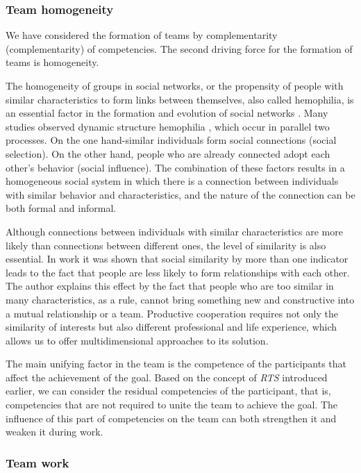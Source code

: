 \documentclass[12pt]{report}
\theoremstyle{definition}
\begin{document}
\subsubsection{Team homogeneity}

We have considered the formation of teams by complementarity (complementarity) of competencies. 
The second driving force for the formation of teams is homogeneity.

The homogeneity of groups in social networks, or the propensity of people with similar characteristics to form links between themselves, also called hemophilia, is an essential factor in the formation and evolution of social networks \cite{mcpherson2001birds}. 
Many studies observed dynamic structure hemophilia \cite{snijders2010introduction,steglich20108}, which occur in parallel two processes.
On the one hand-similar individuals form social connections (social selection). 
On the other hand, people who are already connected adopt each other's behavior (social influence).
The combination of these factors results in a homogeneous social system in which there is a connection between individuals with similar behavior and characteristics, and the nature of the connection can be both formal and informal.

Although connections between individuals with similar characteristics are more likely than connections between different ones, the level of similarity is also essential.
In work \cite{block2014multidimensional} it was shown that social similarity by more than one indicator leads to the fact that people are less likely to form relationships with each other. 
The author explains this effect by the fact that people who are too similar in many characteristics, as a rule, cannot bring something new and constructive into a mutual relationship or a team.
Productive cooperation requires not only the similarity of interests but also different professional and life experience, which allows us to offer multidimensional approaches to its solution.

The main unifying factor in the team is the competence of the participants that affect the achievement of the goal.
Based on the concept of \emph{RTS} introduced earlier, we can consider the residual competencies of the participant, that is, competencies that are not required to unite the team to achieve the goal. 
The influence of this part of competencies on the team can both strengthen it and weaken it during work.

\subsubsection{Team work}
\end{document}
